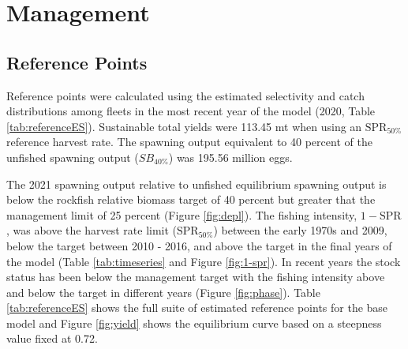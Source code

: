 \documentclass[11pt,
  english,
  a4paper,
]{article}
\begin{document}
\leavevmode\tagmcend\tagstructend\par


\hypertarget{management}{%
\section{Management}\label{management}}

\leavevmode\tagmcend\tagstructend


\hypertarget{reference-points}{%
\subsection{Reference Points}\label{reference-points}}

\leavevmode\tagmcend\tagstructend


Reference points were calculated using the estimated selectivity and catch distributions among fleets in the most recent year of the model (2020, Table \ref{tab:referenceES}). Sustainable total yields were 113.45 mt when using an {\(\text{SPR}_{50\%}\)\leavevmode\tagmcend\tagstructend} reference harvest rate. The spawning output equivalent to 40 percent of the unfished spawning output ({\(SB_{40\%}\)\leavevmode\tagmcend\tagstructend}) was 195.56 million eggs.

\leavevmode\tagmcend\tagstructend\par


The 2021 spawning output relative to unfished equilibrium spawning output is below the rockfish relative biomass target of 40 percent but greater that the management limit of 25 percent (Figure \ref{fig:depl}). The fishing intensity, {\(1-\text{SPR}\)\leavevmode\tagmcend\tagstructend}, was above the harvest rate limit ({\(\text{SPR}_{50\%}\)\leavevmode\tagmcend\tagstructend}) between the early 1970s and 2009, below the target between 2010 - 2016, and above the target in the final years of the model (Table \ref{tab:timeseries} and Figure \ref{fig:1-spr}). In recent years the stock status has been below the management target with the fishing intensity above and below the target in different years (Figure \ref{fig:phase}). Table \ref{tab:referenceES} shows the full suite of estimated reference points for the base model and Figure \ref{fig:yield} shows the equilibrium curve based on a steepness value fixed at 0.72.
\end{document}
